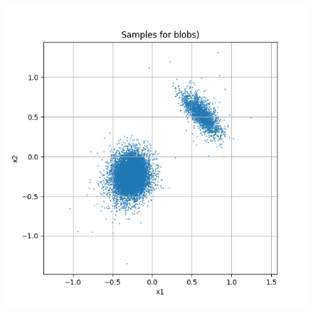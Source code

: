 \documentclass[a4paper,12pt]{article}
\begin{document}
\begin{figure}[H]
\begin{minipage}{0.3\textwidth}
  \end{minipage}
  \begin{minipage}{0.3\textwidth}
      \centering
      \includegraphics[width=\linewidth]{"images/Samples for ddpm_2_50_0.0001_0.02_blobs.png"}
  \end{minipage}

  \vspace{0.5cm}


\end{figure}
\end{document}
